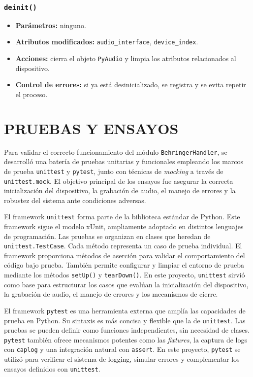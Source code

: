 \subsubsection*{\texttt{deinit()}}

\begin{itemize}
    \item \textbf{Parámetros:} ninguno.
    \item \textbf{Atributos modificados:} \texttt{audio\_interface}, \texttt{device\_index}.
    \item \textbf{Acciones:} cierra el objeto \texttt{PyAudio} y limpia los atributos relacionados al dispositivo.
    \item \textbf{Control de errores:} si ya está desinicializado, se registra y se evita repetir el proceso.
\end{itemize}





\clearpage
\section{PRUEBAS Y ENSAYOS}

Para validar el correcto funcionamiento del módulo \texttt{BehringerHandler}, se desarrolló una batería de pruebas unitarias y funcionales empleando los marcos de prueba \texttt{unittest} y \texttt{pytest}, junto con técnicas de \textit{mocking} a través de \texttt{unittest.mock}. El objetivo principal de los ensayos fue asegurar la correcta inicialización del dispositivo, la grabación de audio, el manejo de errores y la robustez del sistema ante condiciones adversas.

El framework \texttt{unittest} forma parte de la biblioteca estándar de Python. Este framework sigue el modelo xUnit, ampliamente adoptado en distintos lenguajes de programación. Las pruebas se organizan en clases que heredan de \texttt{unittest.TestCase}. Cada método representa un caso de prueba individual. El framework proporciona métodos de aserción para validar el comportamiento del código bajo prueba. También permite configurar y limpiar el entorno de prueba mediante los métodos \texttt{setUp()} y \texttt{tearDown()}. En este proyecto, \texttt{unittest} sirvió como base para estructurar los casos que evalúan la inicialización del dispositivo, la grabación de audio, el manejo de errores y los mecanismos de cierre.

El framework \texttt{pytest} es una herramienta externa que amplía las capacidades de prueba en Python. Su sintaxis es más concisa y flexible que la de \texttt{unittest}. Las pruebas se pueden definir como funciones independientes, sin necesidad de clases. \texttt{pytest} también ofrece mecanismos potentes como las \textit{fixtures}, la captura de logs con \texttt{caplog} y una integración natural con \texttt{assert}. En este proyecto, \texttt{pytest} se utilizó para verificar el sistema de logging, simular errores y complementar los ensayos definidos con \texttt{unittest}.

